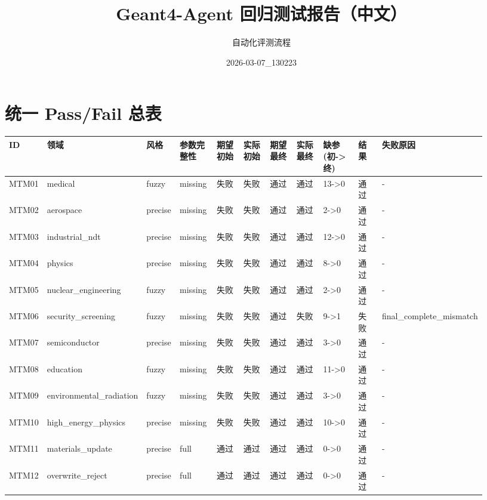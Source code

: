 \documentclass[11pt]{ctexart}
\title{Geant4-Agent 回归测试报告（中文）}
\author{自动化评测流程}
\date{2026-03-07\_130223}
\begin{document}
\maketitle
\section{统一 Pass/Fail 总表}
\begin{longtable}{p{0.06\linewidth}p{0.08\linewidth}p{0.07\linewidth}p{0.08\linewidth}p{0.07\linewidth}p{0.07\linewidth}p{0.07\linewidth}p{0.07\linewidth}p{0.09\linewidth}p{0.06\linewidth}p{0.21\linewidth}}
\toprule
ID & 领域 & 风格 & 参数完整性 & 期望初始 & 实际初始 & 期望最终 & 实际最终 & 缺参(初->终) & 结果 & 失败原因 \\
\midrule
MTM01 & medical & fuzzy & missing & 失败 & 失败 & 通过 & 通过 & 13->0 & 通过 & - \\
MTM02 & aerospace & precise & missing & 失败 & 失败 & 通过 & 通过 & 2->0 & 通过 & - \\
MTM03 & industrial\_ndt & precise & missing & 失败 & 失败 & 通过 & 通过 & 12->0 & 通过 & - \\
MTM04 & physics & precise & missing & 失败 & 失败 & 通过 & 通过 & 8->0 & 通过 & - \\
MTM05 & nuclear\_engineering & fuzzy & missing & 失败 & 失败 & 通过 & 通过 & 2->0 & 通过 & - \\
MTM06 & security\_screening & fuzzy & missing & 失败 & 失败 & 通过 & 失败 & 9->1 & 失败 & final\_complete\_mismatch \\
MTM07 & semiconductor & precise & missing & 失败 & 失败 & 通过 & 通过 & 3->0 & 通过 & - \\
MTM08 & education & fuzzy & missing & 失败 & 失败 & 通过 & 通过 & 11->0 & 通过 & - \\
MTM09 & environmental\_radiation & fuzzy & missing & 失败 & 失败 & 通过 & 通过 & 3->0 & 通过 & - \\
MTM10 & high\_energy\_physics & precise & missing & 失败 & 失败 & 通过 & 通过 & 10->0 & 通过 & - \\
MTM11 & materials\_update & precise & full & 通过 & 通过 & 通过 & 通过 & 0->0 & 通过 & - \\
MTM12 & overwrite\_reject & precise & full & 通过 & 通过 & 通过 & 通过 & 0->0 & 通过 & - \\
\bottomrule
\end{longtable}
\end{document}
